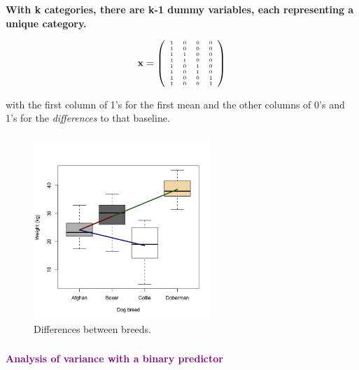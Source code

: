 \documentclass{beamer}
\begin{document}
\begin{frame}
  \frametitle{}
  \textbf{With k categories, there are k-1 dummy variables, each representing a unique category.}
  
  \begin{equation*}
  \tiny {\mathbf{x} = \left( \begin{array}{cccc} 1 & 0 & 0 & 0 \\ 1 & 0 & 0 & 0 \\ 1 & 1 & 0 & 0 \\ 1 & 1 & 0 & 0 \\ 1 & 0 & 1 & 0 \\ 1 & 0 & 1 & 0 \\ 1 & 0 & 0 & 1\\ 1 & 0 & 0 & 1 \end{array}\right) }
  \end{equation*}

  with the first column of 1's for the first mean and the other columns of 0's and 1's for the \textit{differences} to that baseline.
\end{frame}

\begin{frame}
  \frametitle{}
  \begin{figure}[h]
    \centering
    \includegraphics[width=0.6\textwidth]{lectures/day_3_LM_refresh_II/figures/unnamed-chunk-13-1.png} 
    \caption{Differences between breeds.}
  \end{figure}
\end{frame}

\begin{frame}
  \frametitle{}
  \begin{center}
    \huge\textbf{\textcolor{purple}{Analysis of variance with a binary predictor}}
  \end{center}
\end{frame}
\end{document}
